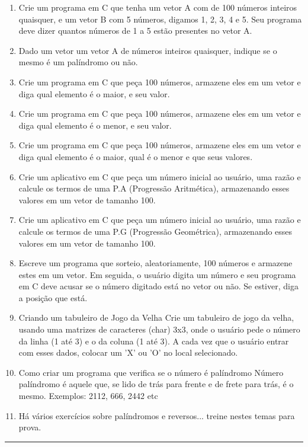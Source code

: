 \documentclass[12pt,a4paper]{article}
\begin{document}
\begin{enumerate}

\item Crie um programa em C que tenha um vetor A com 
de 100 números inteiros quaisquer,
e um vetor B com 5 números, digamos 1, 2, 3,  4 e 5.
Seu programa deve dizer quantos números de 1 a 5 estão presentes
no vetor A.

\item Dado um vetor um vetor A de números inteiros quaisquer,
indique se o mesmo é um palíndromo ou não.


\item Crie um programa em C que peça 100 números, armazene eles em um vetor e diga qual elemento é o maior, e seu valor.




\item  Crie um programa em C que peça 100 números, armazene eles em um vetor e diga qual elemento é o menor, e seu valor.

\item  Crie um programa em C que peça 100 números, armazene eles em um vetor e diga qual elemento é o maior, qual é o menor e que seus valores.


\item  Crie um aplicativo em C que peça um número inicial ao usuário, uma razão e calcule os termos de uma P.A (Progressão Aritmética), armazenando esses valores em um vetor de tamanho 100.

\item  Crie um aplicativo em C que peça um número inicial ao usuário, uma razão e calcule os termos de uma P.G (Progressão Geométrica), armazenando esses valores em um vetor de tamanho 100.

\item  Escreve um programa que sorteio, aleatoriamente, 100 números e armazene estes em um vetor.
Em seguida, o usuário digita um número e seu programa em C deve acusar se o número digitado está no vetor ou não. Se estiver, diga a posição que está.

\item  Criando um tabuleiro de Jogo da Velha
Crie um tabuleiro de jogo da velha, usando uma matrizes de caracteres (char) 3x3, onde o usuário pede o número da linha (1 até 3) e o da coluna (1 até 3). A cada vez que o usuário entrar com esses dados, colocar um 'X' ou 'O' no local selecionado.


\item Como criar um programa que verifica se o número é palíndromo
Número palíndromo é aquele que, se lido de trás para frente e de frete para trás, é o mesmo.
Exemplos: 2112, 666, 2442 etc


\item Há vários exercícios sobre palíndromos e reversos... treine nestes temas para prova.
 
\end{enumerate}



\begin{center}
\rule{15cm}{0.1cm}
\end{center}
\end{document}
